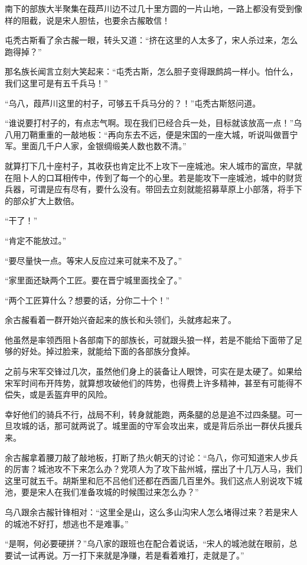南下的部族大半聚集在葭芦川边不过几十里方圆的一片山地，一路上都没有受到像样的阻截，说是宋人胆怯，也要余古赧敢信！

屯秃古斯看了余古赧一眼，转头又道：“挤在这里的人太多了，宋人杀过来，怎么跑得掉？”

那名族长闻言立刻大笑起来：“屯秃古斯，怎么胆子变得跟鹧鸪一样小。怕什么，我们这里可是有五千兵马！”

“乌八，葭芦川这里的村子，可够五千兵马分的？！”屯秃古斯怒问道。

“谁说要打村子的，有点志气啊。现在我们已经合兵一处，目标就该放高一点！”乌八用刀鞘重重的一敲地板：“再向东去不远，便是宋国的一座大城，听说叫做晋宁军。里面几千户人家，金银绸缎美人数也数不清。”

就算打下几十座村子，其收获也肯定比不上攻下一座城池。宋人城市的富庶，早就在阻卜人的口耳相传中，传到了每一个的心里。若是能攻下一座城池，城中的财货兵器，可谓是应有尽有，要什么没有。带回去立刻就能招募草原上小部落，将手下的部众扩大上数倍。

“干了！”

“肯定不能放过。”

“要尽量快一点。等宋人反应过来可就来不及了。”

“家里面还缺两个工匠。要在晋宁城里面找全了。”

“两个工匠算什么？想要的话，分你二十个！”

余古赧看着一群开始兴奋起来的族长和头领们，头就疼起来了。

他虽然是率领西阻卜各部南下的部族长，可就跟头狼一样，若是不能给下面带了足够的好处。掉过脸来，就能给下面的各部族分食掉。

之前与宋军交锋过几次，虽然他们身上的装备让人眼馋，可实在是太硬了。如果给宋军时间布开阵势，就算想攻破他们的阵势，也得费上许多精神，甚至有可能得不偿失，或是丢盔弃甲的风险。

幸好他们的骑兵不行，战局不利，转身就能跑，两条腿的总是追不过四条腿。可一旦攻城的话，那可就两说了。城里面的守军会攻出来，或是背后杀出一群伏兵援兵来。

余古赧拿着腰刀敲了敲地板，打断了热火朝天的讨论：“乌八，你可知道宋人步兵的厉害？城池攻不下来怎么办？党项人为了攻下盐州城，摆出了十几万人马，我们这里可就五千。胡斯里和厄不吕他们还都在西面几百里外。我们这点人别说攻下城池，要是宋人在我们准备攻城的时候围过来怎么办？”

乌八跟余古赧针锋相对：“这里全是山，这么多山沟宋人怎么堵得过来？若是宋人的城池不好打，想逃也不是难事。”

“是啊，何必要硬拼？”乌八家的跟班也在配合着说话，“宋人的城池就在眼前，总要试一试再说。万一打下来就是净赚，若是看着难打，走就是了。”

